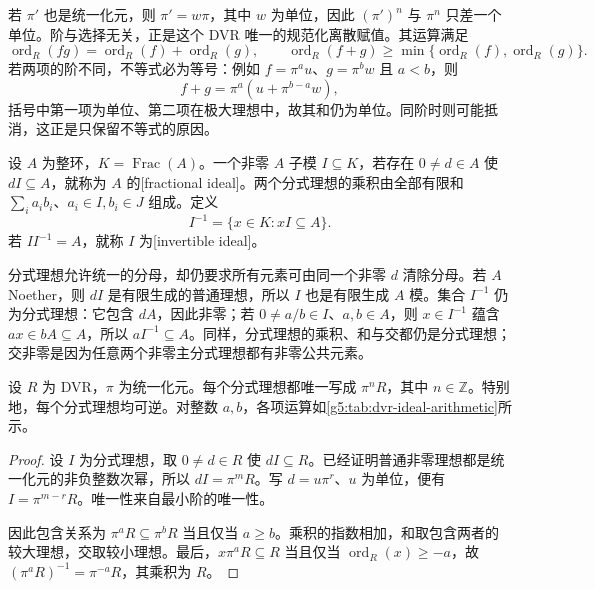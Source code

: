 若 \(\pi'\) 也是统一化元，则 \(\pi'=w\pi\)，其中 \(w\) 为单位，因此 \((\pi')^n\) 与 \(\pi^n\) 只差一个单位。阶与选择无关，正是这个 DVR 唯一的规范化离散赋值。其运算满足
\[
	\operatorname{ord}_R(fg)=\operatorname{ord}_R(f)+\operatorname{ord}_R(g),
	\qquad
	\operatorname{ord}_R(f+g)\geq
	\min\{\operatorname{ord}_R(f),\operatorname{ord}_R(g)\}.
\]
若两项的阶不同，不等式必为等号：例如 \(f=\pi^a u\)、\(g=\pi^b w\) 且 \(a<b\)，则
\[
	f+g=\pi^a(u+\pi^{b-a}w),
\]
括号中第一项为单位、第二项在极大理想中，故其和仍为单位。同阶时则可能抵消，这正是只保留不等式的原因。

\begin{definition}
\label{g5:def:fractional-ideal}
	设 \(A\) 为整环，\(K=\operatorname{Frac}(A)\)。一个非零 \(A\) 子模 \(I\subseteq K\)，若存在 \(0\ne d\in A\) 使 \(dI\subseteq A\)，就称为 \(A\) 的[fractional ideal]。两个分式理想的乘积由全部有限和 \(\sum_i a_ib_i\)、\(a_i\in I,b_i\in J\) 组成。定义
	\[
		I^{-1}=\{x\in K:xI\subseteq A\}.
	\]
	若 \(II^{-1}=A\)，就称 \(I\) 为[invertible ideal]。
\end{definition}

分式理想允许统一的分母，却仍要求所有元素可由同一个非零 \(d\) 清除分母。若 \(A\) Noether，则 \(dI\) 是有限生成的普通理想，所以 \(I\) 也是有限生成 \(A\) 模。集合 \(I^{-1}\) 仍为分式理想：它包含 \(dA\)，因此非零；若 \(0\ne a/b\in I\)、\(a,b\in A\)，则 \(x\in I^{-1}\) 蕴含 \(ax\in bA\subseteq A\)，所以 \(aI^{-1}\subseteq A\)。同样，分式理想的乘积、和与交都仍是分式理想；交非零是因为任意两个非零主分式理想都有非零公共元素。

\begin{proposition}
\label{g5:prop:dvr-fractional-ideals}
	设 \(R\) 为 DVR，\(\pi\) 为统一化元。每个分式理想都唯一写成 \(\pi^nR\)，其中 \(n\in\mathbb Z\)。特别地，每个分式理想均可逆。对整数 \(a,b\)，各项运算如\cref{g5:tab:dvr-ideal-arithmetic}所示。
\end{proposition}
\begin{proof}
	设 \(I\) 为分式理想，取 \(0\ne d\in R\) 使 \(dI\subseteq R\)。已经证明普通非零理想都是统一化元的非负整数次幂，所以 \(dI=\pi^mR\)。写 \(d=u\pi^r\)、\(u\) 为单位，便有 \(I=\pi^{m-r}R\)。唯一性来自最小阶的唯一性。

	因此包含关系为 \(\pi^aR\subseteq\pi^bR\) 当且仅当 \(a\geq b\)。乘积的指数相加，和取包含两者的较大理想，交取较小理想。最后，\(x\pi^aR\subseteq R\) 当且仅当 \(\operatorname{ord}_R(x)\geq-a\)，故 \((\pi^aR)^{-1}=\pi^{-a}R\)，其乘积为 \(R\)。
\end{proof}

